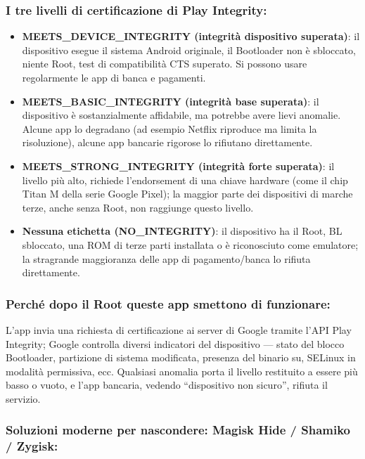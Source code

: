 \subsubsection*{I tre livelli di certificazione di Play Integrity:}

\begin{itemize}
  \item \textbf{MEETS\_DEVICE\_INTEGRITY (integrità dispositivo superata)}: il dispositivo esegue il sistema Android originale, il Bootloader non è sbloccato, niente Root, test di compatibilità CTS superato. Si possono usare regolarmente le app di banca e pagamenti.
  \item \textbf{MEETS\_BASIC\_INTEGRITY (integrità base superata)}: il dispositivo è sostanzialmente affidabile, ma potrebbe avere lievi anomalie. Alcune app lo degradano (ad esempio Netflix riproduce ma limita la risoluzione), alcune app bancarie rigorose lo rifiutano direttamente.
  \item \textbf{MEETS\_STRONG\_INTEGRITY (integrità forte superata)}: il livello più alto, richiede l'endorsement di una chiave hardware (come il chip Titan M della serie Google Pixel); la maggior parte dei dispositivi di marche terze, anche senza Root, non raggiunge questo livello.
  \item \textbf{Nessuna etichetta (NO\_INTEGRITY)}: il dispositivo ha il Root, BL sbloccato, una ROM di terze parti installata o è riconosciuto come emulatore; la stragrande maggioranza delle app di pagamento/banca lo rifiuta direttamente.
\end{itemize}

\subsubsection*{Perché dopo il Root queste app smettono di funzionare:}

L'app invia una richiesta di certificazione ai server di Google tramite l'API Play Integrity; Google controlla diversi indicatori del dispositivo — stato del blocco Bootloader, partizione di sistema modificata, presenza del binario su, SELinux in modalità permissiva, ecc. Qualsiasi anomalia porta il livello restituito a essere più basso o vuoto, e l'app bancaria, vedendo “dispositivo non sicuro”, rifiuta il servizio.

\subsubsection*{Soluzioni moderne per nascondere: Magisk Hide / Shamiko / Zygisk:}

